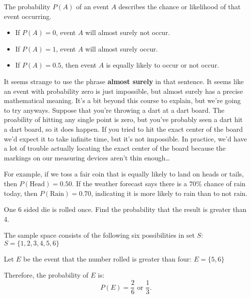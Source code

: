 The probability $P(A)$ of an event $A$ describes the chance or likelihood of that event occurring.
\begin{itemize}
    \item If $P(A) = 0$, event $A$ will almost surely not occur.
    \item If $P(A) = 1$, event $A$ will almost surely occur.
    \item If $P(A) = 0.5$, then event $A$ is equally likely to occur or not occur.
\end{itemize}

\begin{note}
    It seems strange to use the phrase \textbf{almost surely} in that sentence. It seems like an event with probability zero is just impossible, but almost surely has a precise mathematical meaning. It's a bit beyond this course to explain, but we're going to try anyways. Suppose that you're throwing a dart at a dart board. The proability of hitting any single point is zero, but you've probably seen a dart hit a dart board, so it does happen. If you tried to hit the exact center of the board we'd expect it to take infinite time, but it's not impossible. In practice, we'd have a lot of trouble actually locating the exact center of the board because the markings on our measuring devices aren't thin enough\dots
\end{note}


For example, if we toss a fair coin that is equally likely to land on heads or tails, then $P(\text{Head}) = 0.50$. If the weather forecast says there is a $70\%$ chance of rain today, then $P(\text{Rain}) = 0.70$, indicating it is more likely to rain than to not rain.

\begin{example}
    One 6 sided die is rolled once. Find the probability that the result is greater than 4.
\end{example}
\begin{solution}
    The sample space consists of the following six possibilities in set \( S \): \( S = \{1,2,3,4,5,6\} \)

    Let \( E \) be the event that the number rolled is greater than four: \( E = \{5,6\} \)

    Therefore, the probability of \( E \) is:
    \[ P(E) = \frac{2}{6} \text{ or } \frac{1}{3}. \]
\end{solution}



